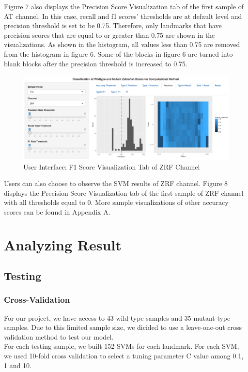 \documentclass[10pt,letterpaper]{article}
\begin{document}
Figure 7 also displays the Precision Score Visualization tab of the
first sample of AT channel. In this case, recall and f1 scores'
thresholds are at default level and precision threshold is set to be
0.75. Therefore, only landmarks that have precision scores that are
equal to or greater than 0.75 are shown in the visualizations. As shown
in the histogram, all values less than 0.75 are removed from the
histogram in figure 6. Some of the blocks in figure 6 are turned into
blank blocks after the precision threshold is increased to 0.75.

\begin{figure}[h]

{\centering \includegraphics[width=5.04in]{figures/shiny8} 

}

\caption{User Interface: F1 Score Visualization Tab of ZRF Channel}\label{fig:shiny8}
\end{figure}

Users can also choose to observe the SVM results of ZRF channel. Figure
8 displays the Precision Score Visualization tab of the first sample of
ZRF channel with all thresholds equal to 0. More sample visualizations
of other accuracy scores can be found in Appendix A.

\section{Analyzing Result}\label{analyzing-result}

\subsection{Testing}\label{testing}

\subsubsection{Cross-Validation}\label{cross-validation}

For our project, we have access to 43 wild-type samples and 35
mutant-type samples. Due to this limited sample size, we dicided to use
a leave-one-out cross validation method to test our model.\\
For each testing sample, we built 152 SVMs for each landmark. For each
SVM, we used 10-fold cross validation to select a tuning parameter C
value among 0.1, 1 and 10.
\end{document}
